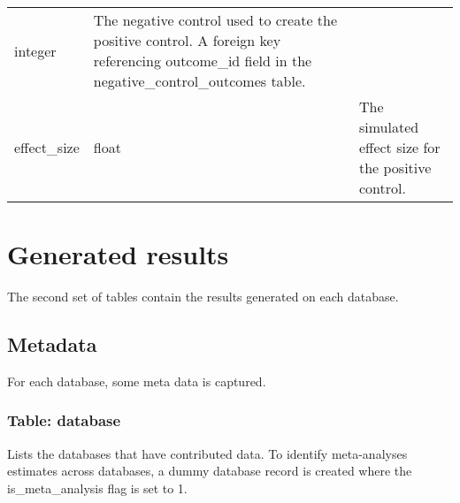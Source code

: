 \documentclass[
]{article}
\begin{document}
\begin{longtable}[]{@{}lll@{}}
\begin{minipage}[t]{0.18\columnwidth}
integer\strut
\end{minipage} & \begin{minipage}[t]{0.50\columnwidth}\raggedright
The negative control used to create the positive control. A foreign key
referencing outcome\_id field in the negative\_control\_outcomes
table.\strut
\end{minipage}\tabularnewline
\begin{minipage}[t]{0.23\columnwidth}\raggedright
effect\_size\strut
\end{minipage} & \begin{minipage}[t]{0.18\columnwidth}\raggedright
float\strut
\end{minipage} & \begin{minipage}[t]{0.50\columnwidth}\raggedright
The simulated effect size for the positive control.\strut
\end{minipage}\tabularnewline
\bottomrule
\end{longtable}

\hypertarget{generated-results}{%
\section{Generated results}\label{generated-results}}

The second set of tables contain the results generated on each database.

\hypertarget{metadata}{%
\subsection{Metadata}\label{metadata}}

For each database, some meta data is captured.

\hypertarget{table-database}{%
\subsubsection{Table: database}\label{table-database}}

Lists the databases that have contributed data. To identify
meta-analyses estimates across databases, a dummy database record is
created where the is\_meta\_analysis flag is set to 1.
\end{document}
